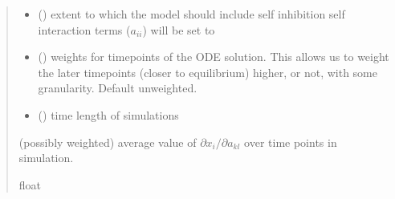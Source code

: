 \documentclass[letterpaper,10pt,english]{sphinxmanual}
\begin{document}
\begin{fulllineitems}
\begin{quote}
\begin{description}
\begin{itemize}
\item {} 
\sphinxAtStartPar
{} () \textendash{} extent to which the model should include self inhibition \sphinxhyphen{} self interaction terms (\(a_{ii}\)) will be set to \sphinxhyphen{}

\item {} 
\sphinxAtStartPar
{} (\sphinxstyleliteralemphasis{\sphinxupquote{{[}}}\sphinxstyleliteralemphasis{\sphinxupquote{{]}}}) \textendash{} weights for time\sphinxhyphen{}points of the ODE solution. This allows us to weight the later timepoints (closer to equilibrium) higher, or not, with some granularity. Default unweighted.

\item {} 
\sphinxAtStartPar
{} () \textendash{} time length of simulations

\end{itemize}

\sphinxAtStartPar
(possibly weighted) average value of \(\partial x_i/\partial a_{kl}\) over time points in simulation.

\sphinxAtStartPar
float

\end{description}\end{quote}

\end{fulllineitems}

\end{document}
